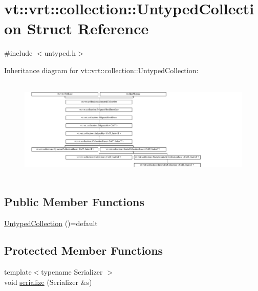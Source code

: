 \hypertarget{structvt_1_1vrt_1_1collection_1_1_untyped_collection}{}\section{vt\+:\+:vrt\+:\+:collection\+:\+:Untyped\+Collection Struct Reference}
\label{structvt_1_1vrt_1_1collection_1_1_untyped_collection}


{\ttfamily \#include $<$untyped.\+h$>$}

Inheritance diagram for vt\+:\+:vrt\+:\+:collection\+:\+:Untyped\+Collection\+:\begin{figure}[H]
\begin{center}
\leavevmode
\includegraphics[height=4.873803cm]{structvt_1_1vrt_1_1collection_1_1_untyped_collection}
\end{center}
\end{figure}
\subsection*{Public Member Functions}
\begin{DoxyCompactItemize}
\item 
\hyperlink{structvt_1_1vrt_1_1collection_1_1_untyped_collection_aebf5af4f6a9b0376dd35e1fb3fd85bac}{Untyped\+Collection} ()=default
\end{DoxyCompactItemize}
\subsection*{Protected Member Functions}
\begin{DoxyCompactItemize}
\item 
{\footnotesize template$<$typename Serializer $>$ }\\void \hyperlink{structvt_1_1vrt_1_1collection_1_1_untyped_collection_a77ef18b8f78de273ba193051dcb69e56}{serialize} (Serializer \&s)
\end{DoxyCompactItemize}


